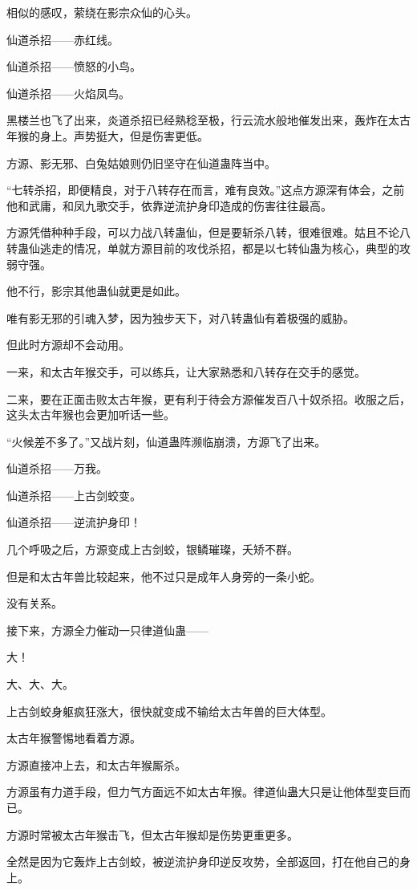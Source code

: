 \begin{this_body}
相似的感叹，萦绕在影宗众仙的心头。

仙道杀招——赤红线。

仙道杀招——愤怒的小鸟。

仙道杀招——火焰凤鸟。

黑楼兰也飞了出来，炎道杀招已经熟稔至极，行云流水般地催发出来，轰炸在太古年猴的身上。声势挺大，但是伤害更低。

方源、影无邪、白兔姑娘则仍旧坚守在仙道蛊阵当中。

“七转杀招，即便精良，对于八转存在而言，难有良效。”这点方源深有体会，之前他和武庸，和凤九歌交手，依靠逆流护身印造成的伤害往往最高。

方源凭借种种手段，可以力战八转蛊仙，但是要斩杀八转，很难很难。姑且不论八转蛊仙逃走的情况，单就方源目前的攻伐杀招，都是以七转仙蛊为核心，典型的攻弱守强。

他不行，影宗其他蛊仙就更是如此。

唯有影无邪的引魂入梦，因为独步天下，对八转蛊仙有着极强的威胁。

但此时方源却不会动用。

一来，和太古年猴交手，可以练兵，让大家熟悉和八转存在交手的感觉。

二来，要在正面击败太古年猴，更有利于待会方源催发百八十奴杀招。收服之后，这头太古年猴也会更加听话一些。

“火候差不多了。”又战片刻，仙道蛊阵濒临崩溃，方源飞了出来。

仙道杀招——万我。

仙道杀招——上古剑蛟变。

仙道杀招——逆流护身印！

几个呼吸之后，方源变成上古剑蛟，银鳞璀璨，夭矫不群。

但是和太古年兽比较起来，他不过只是成年人身旁的一条小蛇。

没有关系。

接下来，方源全力催动一只律道仙蛊——

大！

大、大、大。

上古剑蛟身躯疯狂涨大，很快就变成不输给太古年兽的巨大体型。

太古年猴警惕地看着方源。

方源直接冲上去，和太古年猴厮杀。

方源虽有力道手段，但力气方面远不如太古年猴。律道仙蛊大只是让他体型变巨而已。

方源时常被太古年猴击飞，但太古年猴却是伤势更重更多。

全然是因为它轰炸上古剑蛟，被逆流护身印逆反攻势，全部返回，打在他自己的身上。


\end{this_body}
